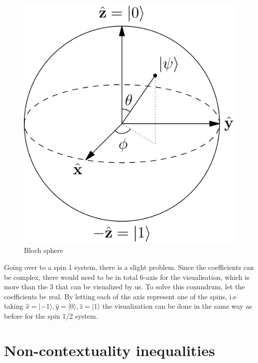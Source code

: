 \begin{figure}[h]
\begin{center}
\includegraphics[scale=0.2]{Bloch_Sphere.png} 
\caption{Bloch sphere}
\label{fig:Bloch}
\end{center}
\end{figure}
Going over to a spin 1 system, there is a slight problem. Since the coefficients can be complex, there would need to be in total 6-axis for the visualisation, which is more than the 3 that can be visualized by us. To solve this conundrum, let the coefficients be real. By letting each of the axis represent one of the spins, i.e taking $\hat{x}=|-1\rangle, \hat{y}=|0\rangle, \hat{z}=|1\rangle$ the visualization can be done in the same way as before for the spin 1/2 system. 
\newpage
\section{Non-contextuality inequalities}\label{sec:intro:Noncontextuality inequalities}
